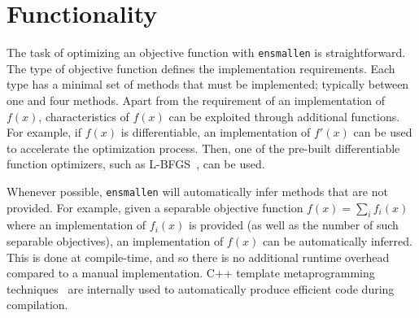 \documentclass[twoside,11pt]{article}
\begin{document}


\section{Functionality}

The task of optimizing an objective function with {\tt ensmallen} is straightforward.
The type of objective function defines the implementation requirements.
Each type has a minimal set of methods that must be implemented;
typically between one and four methods.
Apart from the requirement of an implementation of $f(x)$,
characteristics of $f(x)$ can be exploited through additional functions.
For example, if $f(x)$ is differentiable,
an implementation of $f'(x)$ can be used to accelerate the optimization process.
Then, one of the pre-built differentiable function optimizers,
such as L-BFGS~\citep{liu1989limited}, can be used.

Whenever possible, {\tt ensmallen} will automatically infer methods
that are not provided.
For example, given a separable objective function
$f(x) = \sum_i f_i(x)$
where an implementation of $f_i(x)$ is provided
(as well as the number of such separable objectives),
an implementation of $f(x)$ can be automatically inferred.
This is done at compile-time, and so there is no additional runtime
overhead compared to a manual implementation.
C++ template metaprogramming techniques~\citep{Abrahams_2004,alexandrescu2001modern}
are internally used to automatically produce efficient code during compilation.
\end{document}
